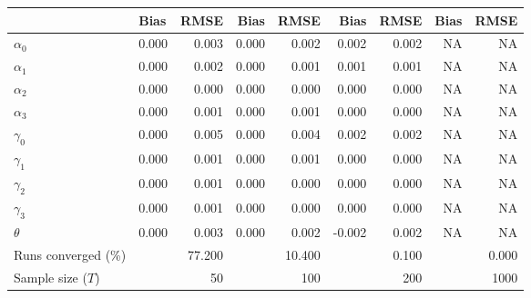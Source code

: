 
\begin{tabular}[t]{llrrrrrrr}
\toprule
  & Bias & RMSE & Bias & RMSE & Bias & RMSE & Bias & RMSE\\
\midrule
$\alpha_{0}$ & 0.000 & 0.003 & 0.000 & 0.002 & 0.002 & 0.002 & NA & NA\\
$\alpha_{1}$ & 0.000 & 0.002 & 0.000 & 0.001 & 0.001 & 0.001 & NA & NA\\
$\alpha_{2}$ & 0.000 & 0.000 & 0.000 & 0.000 & 0.000 & 0.000 & NA & NA\\
$\alpha_{3}$ & 0.000 & 0.001 & 0.000 & 0.001 & 0.000 & 0.000 & NA & NA\\
$\gamma_{0}$ & 0.000 & 0.005 & 0.000 & 0.004 & 0.002 & 0.002 & NA & NA\\
$\gamma_{1}$ & 0.000 & 0.001 & 0.000 & 0.001 & 0.000 & 0.000 & NA & NA\\
$\gamma_{2}$ & 0.000 & 0.001 & 0.000 & 0.000 & 0.000 & 0.000 & NA & NA\\
$\gamma_{3}$ & 0.000 & 0.001 & 0.000 & 0.000 & 0.000 & 0.000 & NA & NA\\
$\theta$ & 0.000 & 0.003 & 0.000 & 0.002 & -0.002 & 0.002 & NA & NA\\
Runs converged (\%) &  & 77.200 &  & 10.400 &  & 0.100 &  & 0.000\\
Sample size ($T$) &  & 50 &  & 100 &  & 200 &  & 1000\\
\bottomrule
\end{tabular}
